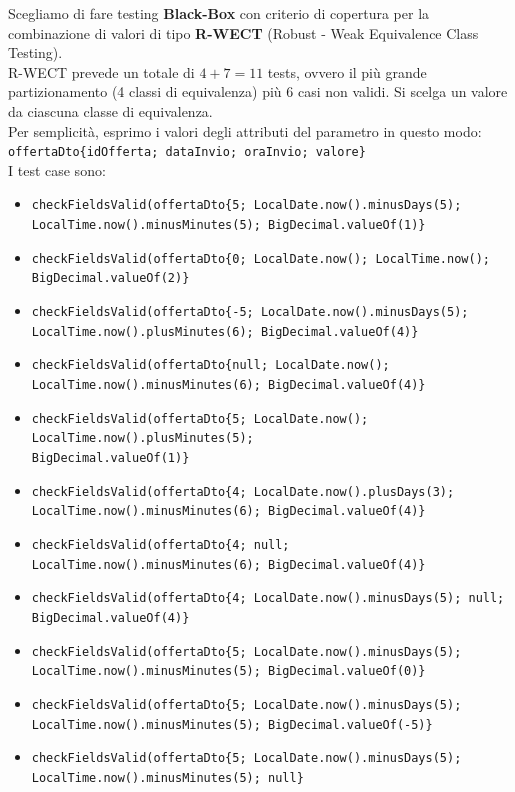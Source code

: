             \noindent Scegliamo di fare testing \textbf{Black-Box} con criterio di copertura per la combinazione di valori di tipo \textbf{R-WECT} (Robust - Weak Equivalence Class Testing).\\
            R-WECT prevede un totale di \(4+7 = 11\) tests, ovvero il più grande partizionamento (4 classi di equivalenza) più 6 casi non validi. Si scelga un valore da ciascuna classe di equivalenza.\\

            \noindent Per semplicità, esprimo i valori degli attributi del parametro in questo modo: \\
            \texttt{offertaDto\{idOfferta; dataInvio; oraInvio; valore\}}\\
            
            \noindent I test case sono:

            \begin{itemize}
                \item \texttt{checkFieldsValid(offertaDto\{5; LocalDate.now().minusDays(5); LocalTime.now().minusMinutes(5); BigDecimal.valueOf(1)\}} %
                \item \texttt{checkFieldsValid(offertaDto\{0; LocalDate.now(); LocalTime.now(); BigDecimal.valueOf(2)\}} %
                \item \texttt{checkFieldsValid(offertaDto\{-5; LocalDate.now().minusDays(5); LocalTime.now().plusMinutes(6); BigDecimal.valueOf(4)\}} %
                \item \texttt{checkFieldsValid(offertaDto\{null; LocalDate.now(); LocalTime.now().minusMinutes(6); BigDecimal.valueOf(4)\}} %
                \item \texttt{checkFieldsValid(offertaDto\{5; LocalDate.now(); LocalTime.now().plusMinutes(5);\\ BigDecimal.valueOf(1)\}} %
                \item \texttt{checkFieldsValid(offertaDto\{4; LocalDate.now().plusDays(3); LocalTime.now().minusMinutes(6); BigDecimal.valueOf(4)\}} %
                \item \texttt{checkFieldsValid(offertaDto\{4; null; LocalTime.now().minusMinutes(6); BigDecimal.valueOf(4)\}} %
                \item \texttt{checkFieldsValid(offertaDto\{4; LocalDate.now().minusDays(5); null; BigDecimal.valueOf(4)\}} %
                \item \texttt{checkFieldsValid(offertaDto\{5; LocalDate.now().minusDays(5); LocalTime.now().minusMinutes(5); BigDecimal.valueOf(0)\}} %
                \item \texttt{checkFieldsValid(offertaDto\{5; LocalDate.now().minusDays(5); LocalTime.now().minusMinutes(5); BigDecimal.valueOf(-5)\}} %
                \item \texttt{checkFieldsValid(offertaDto\{5; LocalDate.now().minusDays(5); LocalTime.now().minusMinutes(5); null\}} %
            \end{itemize}

